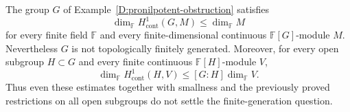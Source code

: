 \begin{proposition}
\label{D:uniform-H1-obstruction}
The group $G$ of Example~\ref{D:pronilpotent-obstruction} satisfies
\[
 \dim_{\mathbb F}H^1_{
 \mathrm{cont}}(G,M)\leq\dim_{\mathbb F}M
\]
for every finite field $\mathbb F$ and every finite-dimensional
continuous $\mathbb F[G]$-module $M$.  Nevertheless $G$ is not
topologically finitely generated.  Moreover, for every open subgroup
$H\subset G$ and every finite continuous $\mathbb F[H]$-module $V$,
\[
 \dim_{\mathbb F}H^1_{
 \mathrm{cont}}(H,V)\leq [G:H]\dim_{\mathbb F}V.
\]
Thus even these estimates together with smallness and the previously
proved restrictions on all open subgroups do not settle the
finite-generation question.
\end{proposition}
